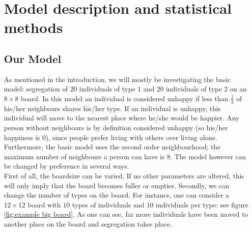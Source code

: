 \section{Model description and statistical methods}
\subsection{Our Model}
As mentioned in the introduction, we will mostly be investigating the basic model: segregation of $20$ individuals of type $1$ and $20$ individuals of type $2$ on an $8 \times 8$ board.
In this model an individual is considered unhappy if less than \(\frac{1}{3}\) of his/her neighbours shares his/her type. If an individual is unhappy, this individual will move to the nearest place where he/she would be happier.
Any person without neighbours is by definition considered unhappy (so his/her happiness is $0$), since people prefer living with others over living alone.
Furthermore, the basic model uses the second order neighbourhood; the maximum number of neighbours a person can have is 8. 
The model however can be changed by preference in several ways.\\

First of all, the boardsize can be varied.
If no other parameters are altered, this will only imply that the board becomes fuller or emptier.
Secondly, we can change the number of types on the board.
For instance, one can consider a $12\times 12$ board with $10$ types of individuals and $10$ individuals per type: see figure \ref{fig:example big board}.
As one can see, far more individuals have been moved to another place on the board and segregation takes place.

